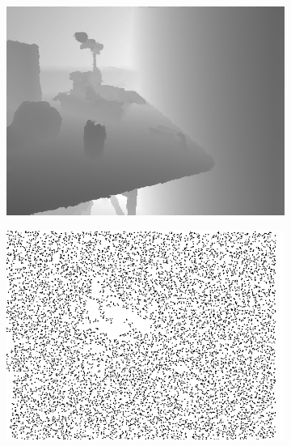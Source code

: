 \documentclass[preprint,10pt,5p,times,twocolumn]{elsarticle}
\begin{document}
\begin{figure}[t]
\begin{center}
\begin{subfigure}[b]{0.136\linewidth}
    \includegraphics[width=\linewidth]{table_structure_missing_inpainting.png}
\end{subfigure}
\begin{subfigure}[b]{0.136\linewidth}
    \includegraphics[width=\linewidth]{table_random_missing_depth.png}
\end{subfigure}
\begin{subfigure}[b]{0.136\linewidth}

\end{subfigure}
\end{center}
\end{figure}
\end{document}
